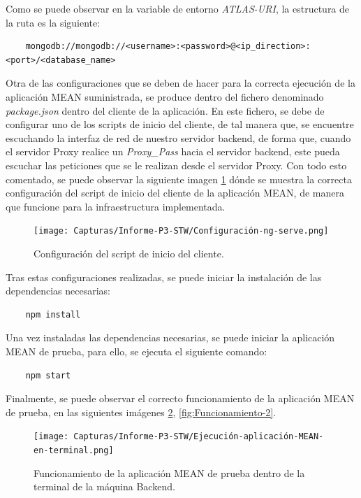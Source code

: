 \documentclass{report}
\begin{document}
  Como se puede observar en la variable de entorno \emph{ATLAS-URI}, la estructura de la ruta es la siguiente:

  \begin{verbatim}
    mongodb://mongodb://<username>:<password>@<ip_direction>:<port>/<database_name>
  \end{verbatim}

  Otra de las configuraciones que se deben de hacer para la correcta ejecución de la aplicación MEAN suministrada, se produce dentro del fichero denominado \emph{package.json} dentro del cliente de la aplicación. En este fichero, se debe de configurar uno de los scripts de inicio del cliente, de tal manera que, se encuentre escuchando la interfaz de red de nuestro servidor backend, de forma que, cuando el servidor Proxy realice un \emph{Proxy\_Pass} hacia el servidor backend, este pueda escuchar las peticiones que se le realizan desde el servidor Proxy. Con todo esto comentado, se puede observar la siguiente imagen \ref{fig:Configuración-script-client} dónde se muestra la correcta configuración del script de inicio del cliente de la aplicación MEAN, de manera que funcione para la infraestructura implementada.

  \begin{figure}[H]
    \centering
    \texttt{[image: Capturas/Informe-P3-STW/Configuración-ng-serve.png]}
    \caption{Configuración del script de inicio del cliente.}
    \label{fig:Configuración-script-client}
  \end{figure}

  Tras estas configuraciones realizadas, se puede iniciar la instalación de las dependencias necesarias:

  \begin{verbatim}
    npm install
  \end{verbatim}

  Una vez instaladas las dependencias necesarias, se puede iniciar la aplicación MEAN de prueba, para ello, se ejecuta el siguiente comando:

  \begin{verbatim}
    npm start
  \end{verbatim}

  Finalmente, se puede observar el correcto funcionamiento de la aplicación MEAN de prueba, en las siguientes imágenes \ref{fig:Funcionamiento-1}, \ref{fig:Funcionamiento-2}.

  \begin{figure}[H]
    \centering
    \texttt{[image: Capturas/Informe-P3-STW/Ejecución-aplicación-MEAN-en-terminal.png]}
    \caption{Funcionamiento de la aplicación MEAN de prueba dentro de la terminal de la máquina Backend.}
    \label{fig:Funcionamiento-1}
  \end{figure}
\end{document}
